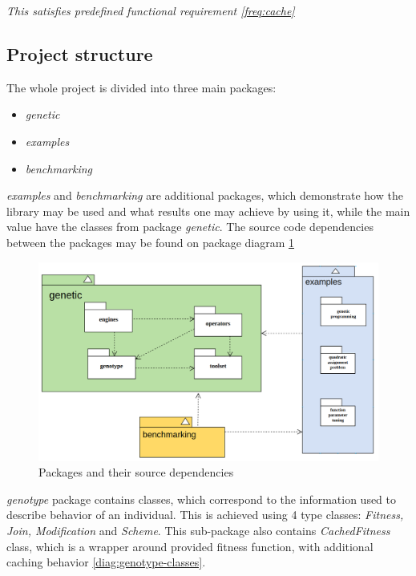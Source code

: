 \begin{itemize}
\smallskip\textit{This satisfies predefined functional requirement \ref{freq:cache}}
 
\medbreak

\end{itemize}

\subsection{Project structure}

The whole project is divided into three main packages:
\begin{itemize}
\item \textit{genetic}
\item \textit{examples}
\item \textit{benchmarking}
\end{itemize}

\textit{examples} and \textit{benchmarking} are additional packages, which demonstrate how the library may be used and what results one may achieve by using it, while the main value have the classes from package \textit{genetic}. The source code dependencies between the packages may be found on package diagram \ref{diag:packages}

\begin{figure}[h]
\centering\includegraphics[width=1.\textwidth]{img/diagrams/alleles-top-packages}
\caption{Packages and their source dependencies}\label{diag:packages}
\end{figure}

\textit{genotype} package contains classes, which correspond to the information used to describe behavior of an individual. This is achieved using 4 type classes: \textit{Fitness, Join, Modification} and \textit{Scheme}. This sub-package also contains \textit{CachedFitness} class, which is a wrapper around provided fitness function, with additional caching behavior \ref{diag:genotype-classes}. 

